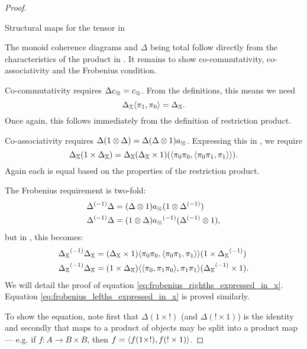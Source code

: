 \begin{proof}
\begin{table}[h!]
\begin{center}
    \end{center}
    \caption{Structural maps for the tensor in \Invc{\X}}
    \label{tab:structural_maps_for_the_tensor_in_invx}
  \end{table}

  The monoid coherence diagrams and $\Delta$ being total follow directly from the characteristics
  of the product in \X. It remains to show co-commutativity, co-associativity and the Frobenius
  condition.

  Co-commutativity requires $\Delta c_{\otimes} = c_{\otimes}$. From the definitions, this means we need
  \[\Delta_{\mathbb{X}} \langle \pi_1,\pi_0\rangle = \Delta_{\mathbb{X}}.\] Once again, this follows immediately from the
  definition of restriction product.

  Co-associativity requires $\Delta (1 \otimes \Delta) = \Delta (\Delta \otimes 1) a_{\otimes}$. Expressing this
  in \X, we require
  \[
    \Delta_{\mathbb{X}} (1 \times \Delta_{\mathbb{X}}) =
      \Delta_{\mathbb{X}}(\Delta_{\mathbb{X}} \times 1) (\langle\pi_0 \pi_0,\langle\pi_0 \pi_1,\pi_1\rangle\rangle).
  \] 
  Again each is equal based on the properties of the restriction product.

  The Frobenius requirement is two-fold:
  \begin{align}
    {\Delta}^{(-1)} \Delta &= (\Delta \otimes1) a_{\otimes}(1\otimes{\Delta}^{(-1)}) \label{eq:frobenius_righths_need_in_invx}\\
    {\Delta}^{(-1)} \Delta &= (1 \otimes \Delta) {a_{\otimes}}^{(-1)}({\Delta}^{(-1)}\otimes 1), \label{eq:frobenius_lefths_need_in_invx}
  \end{align}
  but in \X, this becomes:
  \begin{align}
    {\Delta_{\ensuremath{\mathbb{X}}}}^{(-1)} \Delta_{\mathbb{X}}
      &= (\Delta_{\mathbb{X}} \times 1) \langle\pi_0 \pi_0,\langle\pi_0 \pi_1,\pi_1\rangle\rangle(1\times{\Delta_{\ensuremath{\mathbb{X}}}}^{(-1)})
      \label{eq:frobenius_righths_expressed_in_x}\\
    {\Delta_{\mathbb{X}}}^{(-1)}\Delta_{\mathbb{X}}
      &= (1 \times \Delta_{\mathbb{X}}) \langle\langle\pi_0, \pi_1 \pi_0\rangle,\pi_1 \pi_1\rangle({\Delta_{\mathbb{X}}}^{(-1)}\times 1).
      \label{eq:frobenius_lefths_expressed_in_x}
  \end{align}
  We will detail the proof of equation \vref{eq:frobenius_righths_expressed_in_x}. Equation
  \vref{eq:frobenius_lefths_expressed_in_x} is proved similarly.

  To show the equation, note first that $\Delta(1 \times !)$ (and $\Delta(!\times 1)$) is the
  identity and secondly that maps to a product of objects may be split into a product map --- e.g.
  if $f:A \to B \times B$, then $f = \langle f(1\times !), f(!\times 1)\rangle$.


\end{proof}
